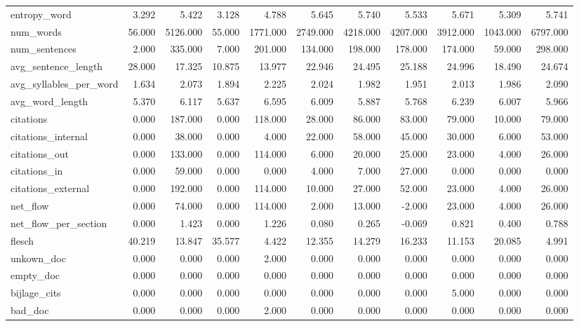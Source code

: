\begin{tabular}{lrrrrrrrrrr}
\cline{1-11}
entropy\_word & 3.292 & 5.422 & 3.128 & 4.788 & 5.645 & 5.740 & 5.533 & 5.671 & 5.309 & 5.741 \\
\cline{1-11}
num\_words & 56.000 & 5126.000 & 55.000 & 1771.000 & 2749.000 & 4218.000 & 4207.000 & 3912.000 & 1043.000 & 6797.000 \\
\cline{1-11}
num\_sentences & 2.000 & 335.000 & 7.000 & 201.000 & 134.000 & 198.000 & 178.000 & 174.000 & 59.000 & 298.000 \\
\cline{1-11}
avg\_sentence\_length & 28.000 & 17.325 & 10.875 & 13.977 & 22.946 & 24.495 & 25.188 & 24.996 & 18.490 & 24.674 \\
\cline{1-11}
avg\_syllables\_per\_word & 1.634 & 2.073 & 1.894 & 2.225 & 2.024 & 1.982 & 1.951 & 2.013 & 1.986 & 2.090 \\
\cline{1-11}
avg\_word\_length & 5.370 & 6.117 & 5.637 & 6.595 & 6.009 & 5.887 & 5.768 & 6.239 & 6.007 & 5.966 \\
\cline{1-11}
citations & 0.000 & 187.000 & 0.000 & 118.000 & 28.000 & 86.000 & 83.000 & 79.000 & 10.000 & 79.000 \\
\cline{1-11}
citations\_internal & 0.000 & 38.000 & 0.000 & 4.000 & 22.000 & 58.000 & 45.000 & 30.000 & 6.000 & 53.000 \\
\cline{1-11}
citations\_out & 0.000 & 133.000 & 0.000 & 114.000 & 6.000 & 20.000 & 25.000 & 23.000 & 4.000 & 26.000 \\
\cline{1-11}
citations\_in & 0.000 & 59.000 & 0.000 & 0.000 & 4.000 & 7.000 & 27.000 & 0.000 & 0.000 & 0.000 \\
\cline{1-11}
citations\_external & 0.000 & 192.000 & 0.000 & 114.000 & 10.000 & 27.000 & 52.000 & 23.000 & 4.000 & 26.000 \\
\cline{1-11}
net\_flow & 0.000 & 74.000 & 0.000 & 114.000 & 2.000 & 13.000 & -2.000 & 23.000 & 4.000 & 26.000 \\
\cline{1-11}
net\_flow\_per\_section & 0.000 & 1.423 & 0.000 & 1.226 & 0.080 & 0.265 & -0.069 & 0.821 & 0.400 & 0.788 \\
\cline{1-11}
flesch & 40.219 & 13.847 & 35.577 & 4.422 & 12.355 & 14.279 & 16.233 & 11.153 & 20.085 & 4.991 \\
\cline{1-11}
unkown\_doc & 0.000 & 0.000 & 0.000 & 2.000 & 0.000 & 0.000 & 0.000 & 0.000 & 0.000 & 0.000 \\
\cline{1-11}
empty\_doc & 0.000 & 0.000 & 0.000 & 0.000 & 0.000 & 0.000 & 0.000 & 0.000 & 0.000 & 0.000 \\
\cline{1-11}
bijlage\_cits & 0.000 & 0.000 & 0.000 & 0.000 & 0.000 & 0.000 & 0.000 & 5.000 & 0.000 & 0.000 \\
\cline{1-11}
bad\_doc & 0.000 & 0.000 & 0.000 & 2.000 & 0.000 & 0.000 & 0.000 & 0.000 & 0.000 & 0.000 \\
\cline{1-11}
\bottomrule
\end{tabular}
